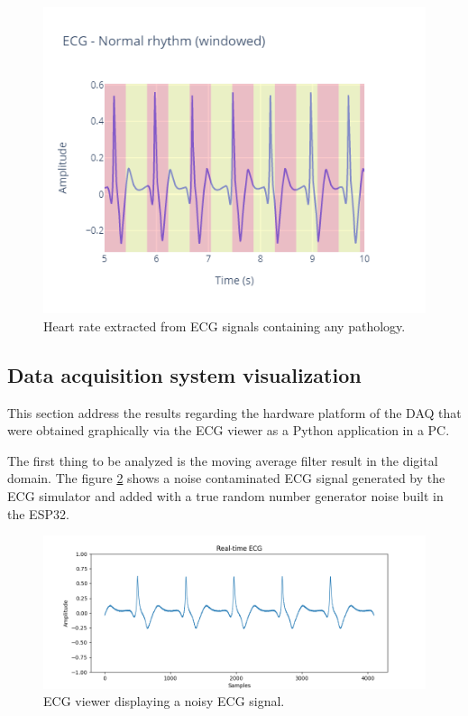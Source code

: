 \begin{figure}[h!] 
    \centering
    \includegraphics[width=\textwidth]{images/heart_rate/windowing_software.png}
    \caption{Heart rate extracted from ECG signals containing any pathology.}
    \label{fig:HR:3}
\end{figure}
\pagebreak

\subsection{Data acquisition system visualization}

This section address the results regarding the hardware platform of the DAQ that were obtained graphically via the ECG viewer as a Python application in a PC.

The first thing to be analyzed is the moving average filter result in the digital domain. The figure \ref{fig:DAQ:1} shows a noise contaminated ECG signal generated by the ECG simulator and added with a true random number generator noise built in the ESP32.

\begin{figure}[h!] 
    \centering
    \includegraphics[width=\textwidth]{images/DAQ/daq_ecg_noise.png}
    \caption{ECG viewer displaying a noisy ECG signal.}
    \label{fig:DAQ:1}
\end{figure}
\pagebreak

